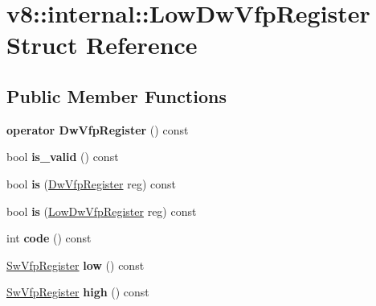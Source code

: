 \hypertarget{structv8_1_1internal_1_1_low_dw_vfp_register}{}\section{v8\+:\+:internal\+:\+:Low\+Dw\+Vfp\+Register Struct Reference}
\label{structv8_1_1internal_1_1_low_dw_vfp_register}
\subsection*{Public Member Functions}
\begin{DoxyCompactItemize}
\item 
{\bfseries operator Dw\+Vfp\+Register} () const \hypertarget{structv8_1_1internal_1_1_low_dw_vfp_register_a19c28175068242ea44e36b885a80c110}{}\label{structv8_1_1internal_1_1_low_dw_vfp_register_a19c28175068242ea44e36b885a80c110}

\item 
bool {\bfseries is\+\_\+valid} () const \hypertarget{structv8_1_1internal_1_1_low_dw_vfp_register_a83b7cb1aea48988a2d5dc5f337e020b7}{}\label{structv8_1_1internal_1_1_low_dw_vfp_register_a83b7cb1aea48988a2d5dc5f337e020b7}

\item 
bool {\bfseries is} (\hyperlink{structv8_1_1internal_1_1_double_register}{Dw\+Vfp\+Register} reg) const \hypertarget{structv8_1_1internal_1_1_low_dw_vfp_register_ac85d82bbdea5b9cec421620c5fce2f22}{}\label{structv8_1_1internal_1_1_low_dw_vfp_register_ac85d82bbdea5b9cec421620c5fce2f22}

\item 
bool {\bfseries is} (\hyperlink{structv8_1_1internal_1_1_low_dw_vfp_register}{Low\+Dw\+Vfp\+Register} reg) const \hypertarget{structv8_1_1internal_1_1_low_dw_vfp_register_aa905a752edfe1fa22f045b0a4196b41b}{}\label{structv8_1_1internal_1_1_low_dw_vfp_register_aa905a752edfe1fa22f045b0a4196b41b}

\item 
int {\bfseries code} () const \hypertarget{structv8_1_1internal_1_1_low_dw_vfp_register_a2454ff380ce614d375bb66c9e5bdcd0e}{}\label{structv8_1_1internal_1_1_low_dw_vfp_register_a2454ff380ce614d375bb66c9e5bdcd0e}

\item 
\hyperlink{structv8_1_1internal_1_1_sw_vfp_register}{Sw\+Vfp\+Register} {\bfseries low} () const \hypertarget{structv8_1_1internal_1_1_low_dw_vfp_register_aa642326fea5d5a7d595679a08a3f592a}{}\label{structv8_1_1internal_1_1_low_dw_vfp_register_aa642326fea5d5a7d595679a08a3f592a}

\item 
\hyperlink{structv8_1_1internal_1_1_sw_vfp_register}{Sw\+Vfp\+Register} {\bfseries high} () const \hypertarget{structv8_1_1internal_1_1_low_dw_vfp_register_a30114d176e4eb631f9f9eb99470b1f72}{}\label{structv8_1_1internal_1_1_low_dw_vfp_register_a30114d176e4eb631f9f9eb99470b1f72}

\end{DoxyCompactItemize}
